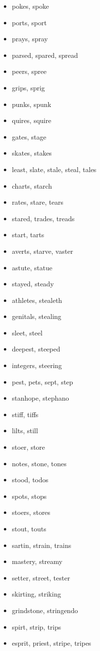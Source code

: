 \documentclass[a4wide,11pt]{report}
\begin{document}
\begin{itemize}
  \item pokes, spoke
  \item ports, sport
  \item prays, spray
  \item parsed, spared, spread
  \item peers, spree
  \item grips, sprig
  \item punks, spunk
  \item quires, squire
  \item gates, stage
  \item skates, stakes
  \item least, slate, stale, steal, tales
  \item charts, starch
  \item rates, stare, tears
  \item stared, trades, treads
  \item start, tarts
  \item averts, starve, vaster
  \item astute, statue
  \item stayed, steady
  \item athletes, stealeth
  \item genitals, stealing
  \item sleet, steel
  \item deepest, steeped
  \item integers, steering
  \item pest, pets, sept, step
  \item stanhope, stephano
  \item stiff, tiffs
  \item lilts, still
  \item stoer, store
  \item notes, stone, tones
  \item stood, todos
  \item spots, stops
  \item stoers, stores
  \item stout, touts
  \item sartin, strain, trains
  \item mastery, streamy
  \item setter, street, tester
  \item skirting, striking
  \item grindstone, stringendo
  \item spirt, strip, trips
  \item esprit, priest, stripe, tripes

\end{itemize}
\end{document}
